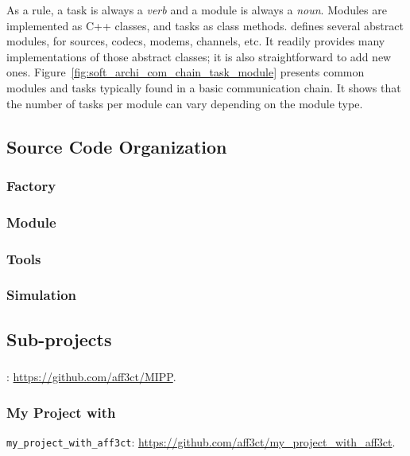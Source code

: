 As a rule, a task is always a \emph{verb} and a module is always a \emph{noun}.
Modules are implemented as C++ classes, and tasks as class methods. \AFFECT
defines several abstract modules, for sources, codecs, modems, channels, etc. It
readily provides many implementations of those abstract classes; it is also
straightforward to add new ones.
Figure~\ref{fig:soft_archi_com_chain_task_module} presents common modules and
tasks typically found in a basic communication chain. It shows that the number
of tasks per module can vary depending on the module type.

\subsection{Source Code Organization}

\subsubsection{Factory}

\subsubsection{Module}

\subsubsection{Tools}

\subsubsection{Simulation}

\subsection{Sub-projects}

\subsubsection{\MIPP}

\MIPP: \url{https://github.com/aff3ct/MIPP}.

\subsubsection{My Project with \AFFECT}

\verb|my_project_with_aff3ct|: \url{https://github.com/aff3ct/my_project_with_aff3ct}.

